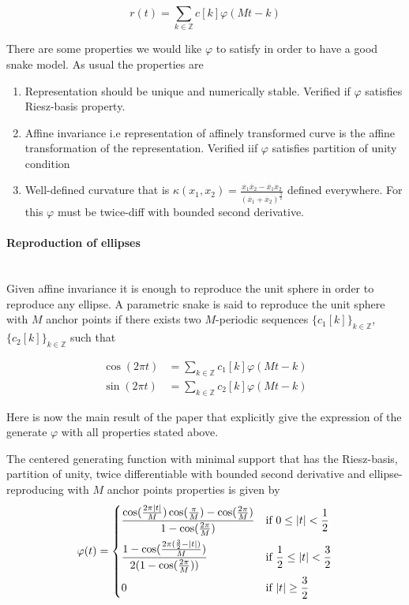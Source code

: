 \documentclass[a4paper, 11pt]{article}
\begin{document}
\begin{equation}
  r(t) = \sum_{k \in \mathbb{Z}} c[k] \varphi (Mt-k)
\end{equation}

There are some properties we would like $\varphi$ to satisfy in order to have a good snake model. As usual the properties 
are

\begin{enumerate}
  \item Representation should be unique and numerically stable. Verified if $\varphi$ satisfies Riesz-basis property.
  \item Affine invariance i.e representation of affinely transformed curve is the affine transformation of the 
    representation. Verified iif $\varphi$ satisfies partition of unity condition
  \item Well-defined curvature that is $\kappa(x_1, x_2) = \frac{\dot{x_1}\ddot{x_2} - \ddot{x_1}\dot{x_2}}{{(\dot{x_1} 
    + \dot{x_2})}^{\frac{3}{2}}}$ defined everywhere. For this $\varphi$ must be twice-diff with bounded second derivative.
\end{enumerate}

\paragraph{Reproduction of ellipses} \mbox{} \\

Given affine invariance it is enough to reproduce the unit sphere in order to reproduce any ellipse. A parametric snake 
is said to reproduce the unit sphere with $M$ anchor points if there exists two $M$-periodic sequences ${\{c_1[k]\}}_{k 
\in \mathbb{Z}}$, ${\{c_2[k]\}}_{k \in \mathbb{Z}}$ such that

\begin{align}
  \cos (2\pi t) &= \sum_{k \in \mathbb{Z}} c_1[k] \varphi (Mt-k) \\
  \sin (2\pi t) &= \sum_{k \in \mathbb{Z}} c_2[k] \varphi (Mt-k)
\end{align}

Here is now the main result of the paper that explicitly give the expression of the generate $\varphi$ with all 
properties stated above.

\begin{thm}{1}
  The centered generating function with minimal support that has the Riesz-basis, partition of unity, twice 
  differentiable with bounded second derivative and ellipse-reproducing with $M$ anchor points properties is given by
    \begin{equation}
      \varphi(t) = \begin{dcases}
        \frac{\cos (\frac{2\pi |t|}{M}) \cos (\frac{\pi}{M}) - \cos (\frac{2\pi}{M})} {1- \cos (\frac{2\pi}{M})} 
        &\text{if } 0 \leq |t| < \frac{1}{2} \\
        \frac{1- \cos (\frac{2\pi(\frac{3}{2} - |t|)}{M})}{2(1 - \cos (\frac{2\pi}{M}))} &\text{if } \frac{1}{2} \leq 
      |t| < \frac{3}{2} \\
      0 &\text{if } |t| \geq \frac{3}{2}
    \end{dcases}
    \end{equation}
\end{thm}
\end{document}
